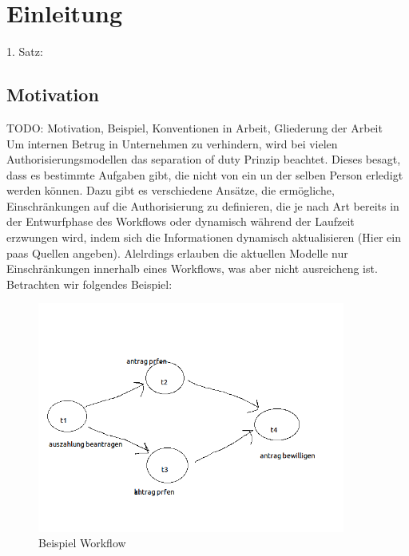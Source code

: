 
\chapter{Einleitung} %

\label{Chapter1} %


1. Satz:\\


\section{Motivation}
TODO: Motivation, Beispiel, Konventionen in Arbeit, Gliederung der Arbeit\\
Um internen Betrug in Unternehmen zu verhindern, wird bei vielen Authorisierungsmodellen das separation of duty Prinzip beachtet. Dieses besagt, dass es bestimmte Aufgaben gibt, die nicht von ein un der selben Person erledigt werden können. Dazu gibt es verschiedene Ansätze, die ermögliche, Einschränkungen auf die Authorisierung zu definieren, die je nach Art bereits in der Entwurfphase des Workflows oder dynamisch während der Laufzeit erzwungen wird, indem sich die Informationen dynamisch aktualisieren (Hier ein paas Quellen angeben). Alelrdings erlauben die aktuellen Modelle nur Einschränkungen innerhalb eines Workflows, was aber nicht ausreicheng ist.\\
Betrachten wir folgendes Beispiel:\\

\begin{figure}[ht]
	\centering
  \includegraphics[width=0.9\textwidth]{"Figures/Workflow"}
	\caption{Beispiel Workflow}
	\label{fig: exampleworkflow}
\end{figure}

